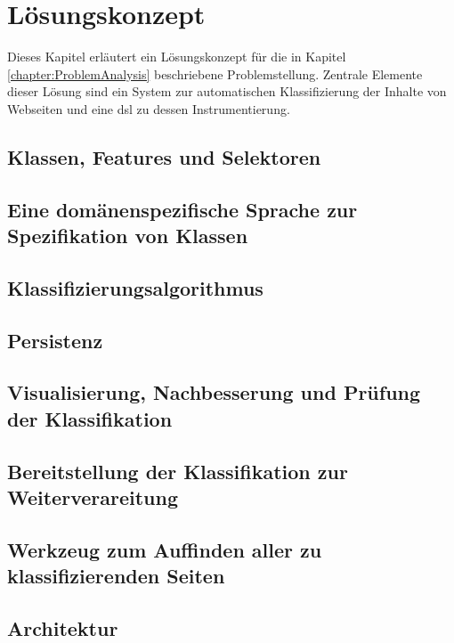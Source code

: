 \chapter{Lösungskonzept}
    \label{chapter:SolutionConcept}
    Dieses Kapitel erläutert ein Lösungskonzept für die in Kapitel \ref{chapter:ProblemAnalysis} beschriebene Problemstellung.
    Zentrale Elemente dieser Lösung sind ein System zur automatischen Klassifizierung der Inhalte von Webseiten
    und eine \gls{dsl} zu dessen Instrumentierung.

    \section{Klassen, Features und Selektoren}
    \section{Eine domänenspezifische Sprache zur Spezifikation von Klassen}
    \section{Klassifizierungsalgorithmus}
        
    \section{Persistenz}
    \section{Visualisierung, Nachbesserung und Prüfung der Klassifikation}
    \section{Bereitstellung der Klassifikation zur Weiterverareitung}
    \section{Werkzeug zum Auffinden aller zu klassifizierenden Seiten}
    \section{Architektur}